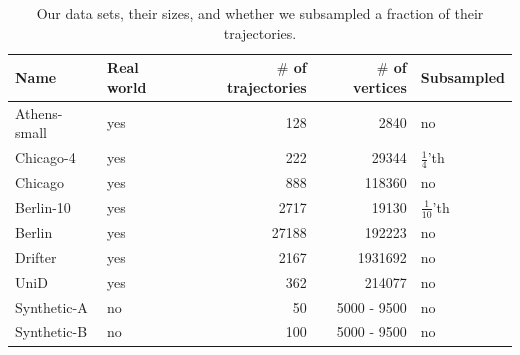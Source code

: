\documentclass[11pt]{article}
\newcommand{\ra}[1]{\renewcommand{\arraystretch}{#1}}
\begin{document}
\begin{table}[h]
    \centering \ra{1.1}
    \begin{tabular}{@{}llrrl@{}}
    \toprule
      \textbf{Name} & \textbf{Real world} & \textbf{$\#$ of trajectories} & \textbf{$\#$ of vertices} & \textbf{Subsampled}  \\
      \midrule
        Athens-small & yes & 128           & 2840 & no \\
        Chicago-4 & yes & 222         & 29344 & $\frac{1}{4}$'th  \\
        Chicago & yes & 888         & 118360 & no \\
        Berlin-10 & yes & 2717         & 19130 & $\frac{1}{10}$'th  \\
        Berlin & yes & 27188        & 192223 & no \\
        Drifter & yes & 2167       & 1931692 & no \\
        UniD & yes & 362        & 214077 & no \\
        Synthetic-A & no & 50 & 5000 - 9500 & no\\
        Synthetic-B & no & 100 &  5000 - 9500 & no \\
        \bottomrule
    \end{tabular}
    \caption{Our data sets, their sizes, and whether we subsampled a fraction of their trajectories.}
        \label{tab:data_sets}
    \label{tab:my_label}
\end{table}
%
\clearpage 
%
\end{document}
